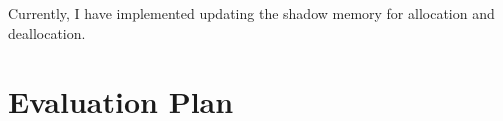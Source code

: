 \documentclass[12pt,twoside]{report}
\begin{document}
Currently, I have implemented updating the shadow memory for allocation and deallocation.

\chapter{Evaluation Plan}



\end{document}
